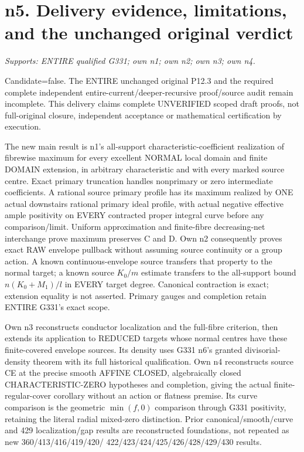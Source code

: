 \documentclass[11pt]{article}
\begin{document}
\section{n5. Delivery evidence, limitations, and the unchanged original verdict}
\textit{Supports: ENTIRE qualified G331; own n1; own n2; own n3; own n4.}

Candidate=false. The ENTIRE unchanged original P12.3 and the required
complete independent entire-current/deeper-recursive proof/source audit
remain incomplete. This delivery claims complete UNVERIFIED scoped draft
proofs, not full-original closure, independent acceptance or mathematical
certification by execution.

The new main result is n1's all-support characteristic-coefficient
realization of fibrewise maximum for every excellent NORMAL local domain
and finite DOMAIN extension, in arbitrary characteristic and with every
marked source centre. Exact primary truncation handles nonprimary or zero
intermediate coefficients. A rational source primary profile has its
maximum realized by ONE actual downstairs rational primary ideal profile,
with actual negative effective ample positivity on EVERY contracted proper
integral curve before any comparison/limit. Uniform approximation and
finite-fibre decreasing-net interchange prove maximum preserves C and D.
Own n2 consequently proves exact RAW envelope pullback without assuming
source continuity or a group action. A known continuous-envelope source
transfers that property to the normal target; a known source $K_0/m$
estimate transfers to the all-support bound $n(K_0+M_1)/l$ in EVERY
target degree. Canonical contraction is exact; extension equality is not
asserted. Primary gauges and completion retain ENTIRE G331's exact scope.

Own n3 reconstructs conductor localization and the full-fibre criterion,
then extends its application to REDUCED targets whose normal centres have
these finite-covered envelope sources. Its density uses G331 n6's granted
divisorial-density theorem with its full historical qualification.
Own n4 reconstructs source CE at the precise smooth AFFINE CLOSED,
algebraically closed CHARACTERISTIC-ZERO hypotheses and completion,
giving the actual finite-regular-cover corollary without an action or
flatness premise. Its curve comparison is the geometric $\min(f,0)$
comparison through G331 positivity, retaining the literal radial mixed-zero
distinction. Prior canonical/smooth/curve and 429 localization/gap results
are reconstructed foundations, not repeated as new 360/413/416/419/420/
422/423/424/425/426/428/429/430 results.
\end{document}
